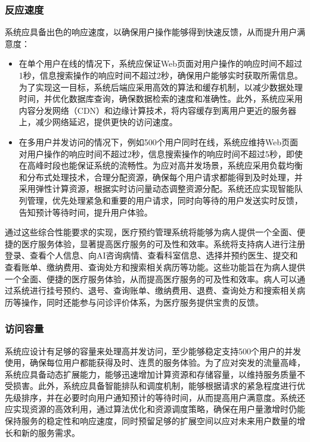 \subsubsection{反应速度}
系统应具备出色的响应速度，以确保用户操作能够得到快速反馈，从而提升用户满意度：
\begin{itemize}
	\item 在单个用户在线的情况下，系统应保证Web页面对用户操作的响应时间不超过1秒，信息搜索操作的响应时间不超过2秒，确保用户能够实时获取所需信息。为了实现这一目标，系统后端应采用高效的算法和缓存机制，以减少数据处理时间，并优化数据库查询，确保数据检索的速度和准确性。此外，系统应采用内容分发网络（CDN）和边缘计算技术，将内容缓存到离用户更近的服务器上，减少网络延迟，提供更快的访问速度。
	\item 在多用户并发访问的情况下，例如500个用户同时在线，系统应维持Web页面对用户操作的响应时间不超过2秒，信息搜索操作的响应时间不超过5秒，即使在高峰时段也能保证系统的流畅性。为应对高并发场景，系统应采用负载均衡和分布式处理技术，合理分配资源，确保每个用户请求都能得到及时处理，并采用弹性计算资源，根据实时访问量动态调整资源分配。系统还应实现智能队列管理，优先处理紧急和重要的用户请求，同时向等待的用户发送实时反馈，告知预计等待时间，提升用户体验。
\end{itemize}

通过这些综合性能要求的实现，医疗预约管理系统将能够为病人提供一个全面、便捷的医疗服务体验，显著提高医疗服务的可及性和效率。系统将支持病人进行注册登录、查看个人信息、向AI咨询病情、查看科室信息、选择并预约医生、提交和查看账单、缴纳费用、查询处方和搜索相关病历等功能。这些功能旨在为病人提供一个全面、便捷的医疗服务体验，从而提高医疗服务的可及性和效率。病人可以通过系统进行挂号预约、退号、查询账单、缴纳费用、退费、查询处方和搜索相关病历等操作，同时还能参与问诊评价体系，为医疗服务提供宝贵的反馈。


\subsubsection{访问容量}
系统应设计有足够的容量来处理高并发访问，至少能够稳定支持500个用户的并发使用，确保每位用户都能获得及时、连贯的服务体验。为了应对突发的流量高峰，系统应具备动态扩展能力，能够迅速增加计算资源和存储容量，以维持服务质量不受损害。此外，系统应具备智能排队和调度机制，能够根据请求的紧急程度进行优先级排序，并在必要时向用户通知预计的等待时间，从而提高用户满意度。系统还应实现资源的高效利用，通过算法优化和资源调度策略，确保在用户量激增时仍能保持服务的稳定性和响应速度，同时预留足够的扩展空间以应对未来用户数量的增长和新的服务需求。


